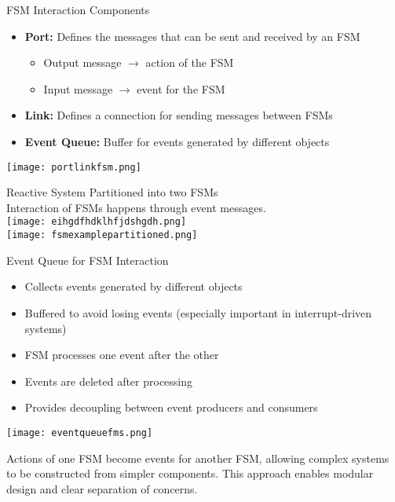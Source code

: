 \begin{definition}{FSM Interaction Components}
\begin{itemize}
    \item \textbf{Port:} Defines the messages that can be sent and received by an FSM
        \begin{itemize}
            \item Output message $\rightarrow$ action of the FSM
            \item Input message $\rightarrow$ event for the FSM
        \end{itemize}
    \item \textbf{Link:} Defines a connection for sending messages between FSMs
    \item \textbf{Event Queue:} Buffer for events generated by different objects
\end{itemize}
\texttt{[image: portlinkfsm.png]}
\end{definition}

\begin{example2}{Reactive System Partitioned into two FSMs}\\
    Interaction of FSMs happens through event messages.\\
    \texttt{[image: eihgdfhdklhfjdshgdh.png]}\\
\texttt{[image: fsmexamplepartitioned.png]}
\end{example2}

\begin{concept}{Event Queue for FSM Interaction}
\begin{itemize}
    \item Collects events generated by different objects
    \item Buffered to avoid losing events (especially important in interrupt-driven systems)
    \item FSM processes one event after the other
    \item Events are deleted after processing
    \item Provides decoupling between event producers and consumers
\end{itemize}
\texttt{[image: eventqueuefms.png]}

Actions of one FSM become events for another FSM, allowing complex systems to be constructed from simpler components. This approach enables modular design and clear separation of concerns.
\end{concept}



